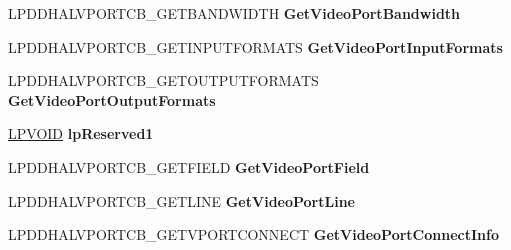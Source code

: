 \begin{DoxyCompactItemize}
\mbox{\label{struct___d_d_h_a_l___d_d_v_i_d_e_o_p_o_r_t_c_a_l_l_b_a_c_k_s_abc8445eaaa744ab37bea9bdddef5245c}} 
L\+P\+D\+D\+H\+A\+L\+V\+P\+O\+R\+T\+C\+B\+\_\+\+G\+E\+T\+B\+A\+N\+D\+W\+I\+D\+TH {\bfseries Get\+Video\+Port\+Bandwidth}
\item 
\mbox{\label{struct___d_d_h_a_l___d_d_v_i_d_e_o_p_o_r_t_c_a_l_l_b_a_c_k_s_a44441535d458820ef8e7bf1820c6f782}} 
L\+P\+D\+D\+H\+A\+L\+V\+P\+O\+R\+T\+C\+B\+\_\+\+G\+E\+T\+I\+N\+P\+U\+T\+F\+O\+R\+M\+A\+TS {\bfseries Get\+Video\+Port\+Input\+Formats}
\item 
\mbox{\label{struct___d_d_h_a_l___d_d_v_i_d_e_o_p_o_r_t_c_a_l_l_b_a_c_k_s_a56f79e66213f188b7a9f0b8d9ed99b46}} 
L\+P\+D\+D\+H\+A\+L\+V\+P\+O\+R\+T\+C\+B\+\_\+\+G\+E\+T\+O\+U\+T\+P\+U\+T\+F\+O\+R\+M\+A\+TS {\bfseries Get\+Video\+Port\+Output\+Formats}
\item 
\mbox{\label{struct___d_d_h_a_l___d_d_v_i_d_e_o_p_o_r_t_c_a_l_l_b_a_c_k_s_aeb6cca9f549b00bee1e387a864c0ca01}} 
\hyperlink{interfacevoid}{L\+P\+V\+O\+ID} {\bfseries lp\+Reserved1}
\item 
\mbox{\label{struct___d_d_h_a_l___d_d_v_i_d_e_o_p_o_r_t_c_a_l_l_b_a_c_k_s_a06afe31345ac9619842d5d169e6d4dbf}} 
L\+P\+D\+D\+H\+A\+L\+V\+P\+O\+R\+T\+C\+B\+\_\+\+G\+E\+T\+F\+I\+E\+LD {\bfseries Get\+Video\+Port\+Field}
\item 
\mbox{\label{struct___d_d_h_a_l___d_d_v_i_d_e_o_p_o_r_t_c_a_l_l_b_a_c_k_s_ab90ee3e3a98fe83fbd347afc2c205f8e}} 
L\+P\+D\+D\+H\+A\+L\+V\+P\+O\+R\+T\+C\+B\+\_\+\+G\+E\+T\+L\+I\+NE {\bfseries Get\+Video\+Port\+Line}
\item 
\mbox{\label{struct___d_d_h_a_l___d_d_v_i_d_e_o_p_o_r_t_c_a_l_l_b_a_c_k_s_a3a6127e8f119cbb99bc11d01c8bef954}} 
L\+P\+D\+D\+H\+A\+L\+V\+P\+O\+R\+T\+C\+B\+\_\+\+G\+E\+T\+V\+P\+O\+R\+T\+C\+O\+N\+N\+E\+CT {\bfseries Get\+Video\+Port\+Connect\+Info}

\end{DoxyCompactItemize}
